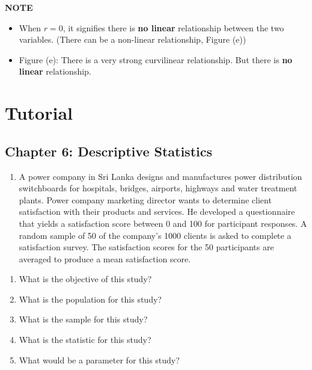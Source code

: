 \documentclass[]{book}
\providecommand{\tightlist}{%
  \setlength{\itemsep}{0pt}\setlength{\parskip}{0pt}}
\begin{document}
\textbf{NOTE}

\begin{itemize}
\tightlist
\item
  When \(r=0\), it signifies there is \textbf{no linear} relationship between the two variables. (There can be a non-linear relationship, Figure (e))
\item
  Figure (e): There is a very strong curvilinear relationship. But there is \textbf{no linear} relationship.
\end{itemize}

\newpage


\hypertarget{tutorial-4}{%
\section{Tutorial}\label{tutorial-4}}

\hypertarget{chapter-6-descriptive-statistics}{%
\subsection*{Chapter 6: Descriptive Statistics}\label{chapter-6-descriptive-statistics}}

\begin{enumerate}
\def\labelenumi{\arabic{enumi}.}
\tightlist
\item
  A power company in Sri Lanka designs and manufactures power distribution switchboards for hospitals, bridges, airports, highways and water treatment plants. Power company marketing director wants to determine client satisfaction with their products and services. He developed a questionnaire that yields a satisfaction score between 0 and 100 for participant responses. A random sample of 50 of the company's 1000 clients is asked to complete a satisfaction survey. The satisfaction scores for the 50 participants are averaged to produce a mean satisfaction score.
\end{enumerate}

\begin{enumerate}
\def\labelenumi{\alph{enumi}.}
\tightlist
\item
  What is the objective of this study?
\item
  What is the population for this study?
\item
  What is the sample for this study?
\item
  What is the statistic for this study?
\item
  What would be a parameter for this study?
\end{enumerate}
\end{document}
